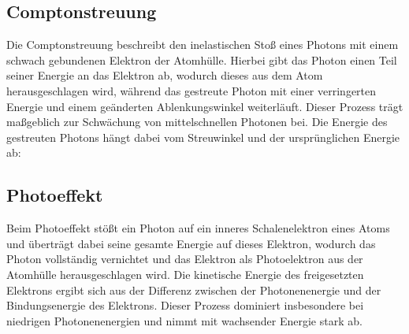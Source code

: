 
\subsection{Comptonstreuung}
Die Comptonstreuung beschreibt den inelastischen Stoß eines Photons mit einem schwach gebundenen Elektron der Atomhülle. Hierbei gibt das Photon einen Teil seiner Energie an das Elektron ab, wodurch dieses aus dem Atom herausgeschlagen wird, während das gestreute Photon mit einer verringerten Energie und einem geänderten Ablenkungswinkel weiterläuft. Dieser Prozess trägt maßgeblich zur Schwächung von mittelschnellen Photonen bei. Die Energie des gestreuten Photons hängt dabei vom Streuwinkel und der ursprünglichen Energie ab:

\subsection{Photoeffekt}
Beim Photoeffekt stößt ein Photon auf ein inneres Schalenelektron eines Atoms und überträgt dabei seine gesamte Energie auf dieses Elektron, wodurch das Photon vollständig vernichtet und das Elektron als Photoelektron aus der Atomhülle herausgeschlagen wird. Die kinetische Energie des freigesetzten Elektrons ergibt sich aus der Differenz zwischen der Photonenenergie und der Bindungsenergie des Elektrons. Dieser Prozess dominiert insbesondere bei niedrigen Photonenenergien und nimmt mit wachsender Energie stark ab.

